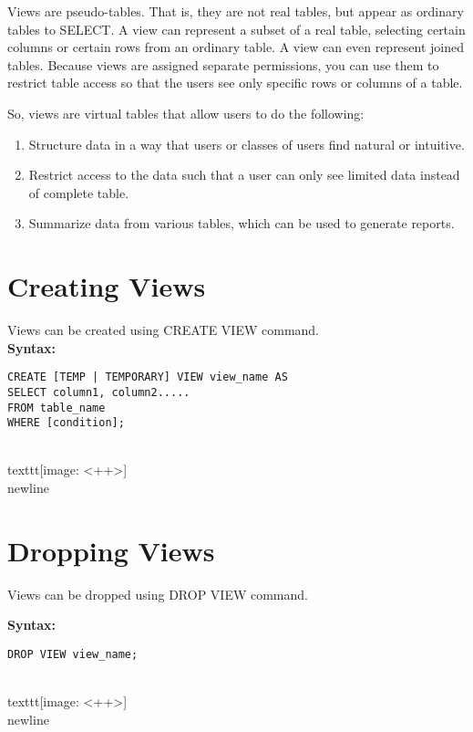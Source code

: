 \documentclass[10pt,a4paper,titlepage]{report}
\begin{document}
{Views are pseudo-tables. That is, they are not real tables, but appear as ordinary tables to SELECT. A view can represent a subset of a real table, selecting certain columns or certain rows from an ordinary table. A view can even represent joined tables. Because views are assigned separate permissions, you can use them to restrict table access so that the users see only specific rows or columns of a table.

So, views are virtual tables that allow users to do the following:
\begin{enumerate}
		\item Structure data in a way that users or classes of users find natural or intuitive.
		\item Restrict access to the data such that a user can only see limited data instead of complete table.
		\item Summarize data from various tables, which can be used to generate reports.
\end{enumerate}

\section{Creating Views}

Views can be created using CREATE VIEW command. 
\\

\textbf{Syntax:}
\begin{verbatim}
CREATE [TEMP | TEMPORARY] VIEW view_name AS
SELECT column1, column2.....
FROM table_name
WHERE [condition];
\end{verbatim}

\\texttt{[image: <++>]}\\newline

\section{Dropping Views}

Views can be dropped using DROP VIEW command.

\textbf{Syntax:}
\begin{verbatim}
DROP VIEW view_name;
\end{verbatim}

\\texttt{[image: <++>]}\\newline

}
\end{document}
